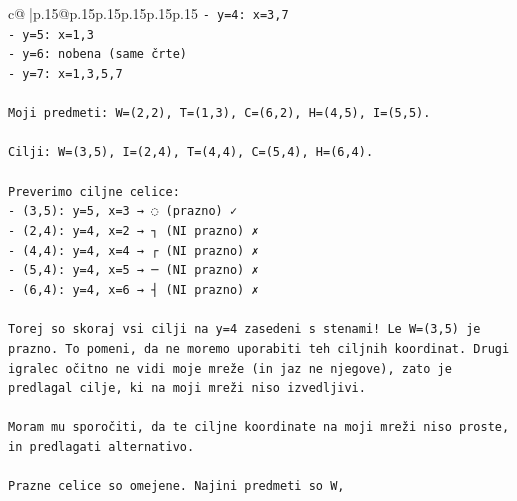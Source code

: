 \documentclass{article}
\begin{document}
{\begin{supertabular}{c@{$\;$}|p{.15\linewidth}@{}p{.15\linewidth}p{.15\linewidth}p{.15\linewidth}p{.15\linewidth}p{.15\linewidth}}
{{{\texttt{{-} y=4: x=3,7} \\
\texttt{{-} y=5: x=1,3} \\
\texttt{{-} y=6: nobena (same črte)} \\
\texttt{{-} y=7: x=1,3,5,7} \\
\\ 
\texttt{Moji predmeti: W=(2,2), T=(1,3), C=(6,2), H=(4,5), I=(5,5).} \\
\\ 
\texttt{Cilji: W=(3,5), I=(2,4), T=(4,4), C=(5,4), H=(6,4).} \\
\\ 
\texttt{Preverimo ciljne celice:} \\
\texttt{{-} (3,5): y=5, x=3 → ◌ (prazno) ✓} \\
\texttt{{-} (2,4): y=4, x=2 → ┐ (NI prazno) ✗} \\
\texttt{{-} (4,4): y=4, x=4 → ┌ (NI prazno) ✗} \\
\texttt{{-} (5,4): y=4, x=5 → ─ (NI prazno) ✗} \\
\texttt{{-} (6,4): y=4, x=6 → ┤ (NI prazno) ✗} \\
\\ 
\texttt{Torej so skoraj vsi cilji na y=4 zasedeni s stenami! Le W=(3,5) je prazno. To pomeni, da ne moremo uporabiti teh ciljnih koordinat. Drugi igralec očitno ne vidi moje mreže (in jaz ne njegove), zato je predlagal cilje, ki na moji mreži niso izvedljivi.} \\
\\ 
\texttt{Moram mu sporočiti, da te ciljne koordinate na moji mreži niso proste, in predlagati alternativo.} \\
\\ 
\texttt{Prazne celice so omejene. Najini predmeti so W,} \\
            }
        }
    }
     \\ \\


\end{supertabular}}
\end{document}
